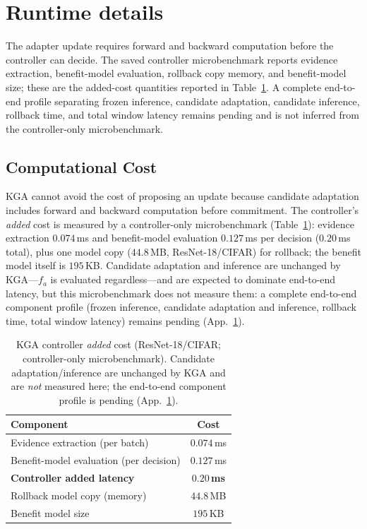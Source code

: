 \section{Runtime details}\label{app:runtime}
The adapter update requires forward and backward computation before the controller can decide.
The saved controller microbenchmark reports evidence extraction, benefit-model evaluation, rollback
copy memory, and benefit-model size; these are the added-cost quantities reported in
Table~\ref{tab:cost}. A complete end-to-end profile separating frozen inference, candidate
adaptation, candidate inference, rollback time, and total window latency remains pending and is not
inferred from the controller-only microbenchmark.
\subsection{Computational Cost}
KGA cannot avoid the cost of proposing an update because candidate adaptation includes forward and
backward computation before commitment. The controller's \emph{added} cost is measured by a
controller-only microbenchmark (Table~\ref{tab:cost}): evidence
extraction $0.074$\,ms and benefit-model evaluation $0.127$\,ms per decision ($0.20$\,ms total),
plus one model copy ($44.8$\,MB, ResNet-18/CIFAR) for rollback; the benefit model itself is
$195$\,KB. Candidate adaptation and inference are unchanged by KGA---$f_a$ is evaluated
regardless---and are expected to dominate end-to-end latency, but this microbenchmark does not
measure them: a complete end-to-end component profile (frozen inference, candidate adaptation and
inference, rollback time, total window latency) remains pending (App.~\ref{app:runtime}).

\begin{table}[t]\centering\footnotesize
\caption{KGA controller \emph{added} cost (ResNet-18/CIFAR; controller-only microbenchmark).
Candidate adaptation/inference are unchanged by KGA and are \emph{not} measured here; the
end-to-end component profile is pending (App.~\ref{app:runtime}).}
\label{tab:cost}
\begin{tabular}{lc}
\toprule
Component & Cost \\
\midrule
Evidence extraction (per batch) & $0.074$\,ms \\
Benefit-model evaluation (per decision) & $0.127$\,ms \\
\textbf{Controller added latency} & $\mathbf{0.20}$\,\textbf{ms} \\
Rollback model copy (memory) & $44.8$\,MB \\
Benefit model size & $195$\,KB \\
\bottomrule
\end{tabular}
\end{table}

